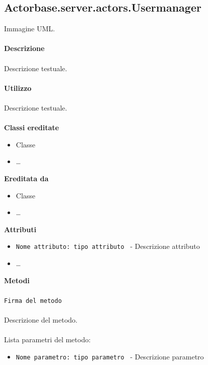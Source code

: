 \documentclass[a4paper]{article}
\begin{document}
	\subsection{Actorbase.server.actors.Usermanager}
		Immagine UML.
		\\ \\
		\textbf{Descrizione}
			\\ \\
			Descrizione testuale.
			\\ \\
		\textbf{Utilizzo}
			\\ \\
			Descrizione testuale.
			\\ \\
		\textbf{Classi ereditate}
			\begin{itemize}
				\item Classe
				\item \dots
			\end{itemize}
		\textbf{Ereditata da}
			\begin{itemize}
				\item Classe
				\item \dots
			\end{itemize}
		\textbf{Attributi}
			\begin{itemize}
				\item \texttt{Nome attributo: tipo attributo } - Descrizione attributo
				\item \dots
			\end{itemize}
		\textbf{Metodi}
			\\ \\
			\texttt{Firma del metodo}
			\\ \\
			Descrizione del metodo.
			\\ \\
			Lista parametri del metodo:
			\begin{itemize}
				\item \texttt{Nome parametro: tipo parametro } - Descrizione parametro
			\end{itemize}
			
\end{document}
